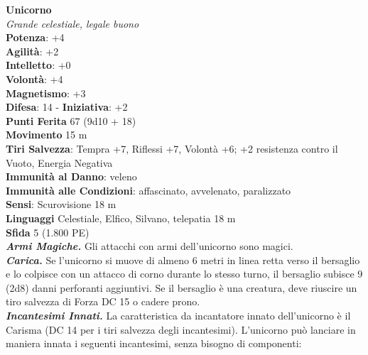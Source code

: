 \begin{multicols}{2}
\medskip\textbf{Unicorno}\\
\emph{Grande celestiale, legale buono}\\
\textbf{Potenza}: +4\\
\textbf{Agilità}: +2\\
\textbf{Intelletto}: +0\\
\textbf{Volontà}: +4\\
\textbf{Magnetismo}: +3\\
\textbf{Difesa}: 14 - \textbf{Iniziativa}: +2\\
\textbf{Punti Ferita} 67 (9d10 + 18)\\
\textbf{Movimento} 15 m\\
\textbf{Tiri Salvezza}: Tempra +7, Riflessi +7, Volontà +6; +2 resistenza contro il Vuoto, Energia Negativa\\
\textbf{Immunità al Danno}: veleno\\
\textbf{Immunità alle Condizioni}: affascinato, avvelenato, paralizzato\\
\textbf{Sensi}: Scurovisione 18 m\\
\textbf{Linguaggi} Celestiale, Elfico, Silvano, telepatia 18 m\\
\textbf{Sfida} 5 (1.800 PE)\smallskip\\
\emph{\textbf{Armi Magiche.}} Gli attacchi con armi dell'unicorno sono magici.\\
\emph{\textbf{Carica.}} Se l'unicorno si muove di almeno 6 metri in linea retta verso il bersaglio e lo colpisce con un attacco di corno durante lo stesso turno, il bersaglio subisce 9 (2d8) danni perforanti aggiuntivi. Se il bersaglio è una creatura, deve riuscire un tiro salvezza di Forza DC 15 o cadere prono.\\

\emph{\textbf{Incantesimi Innati.}} La caratteristica da incantatore innato dell'unicorno è il Carisma (DC 14 per i tiri salvezza degli incantesimi). L'unicorno può lanciare in maniera innata i seguenti incantesimi, senza bisogno di componenti:\\


\end{multicols}

